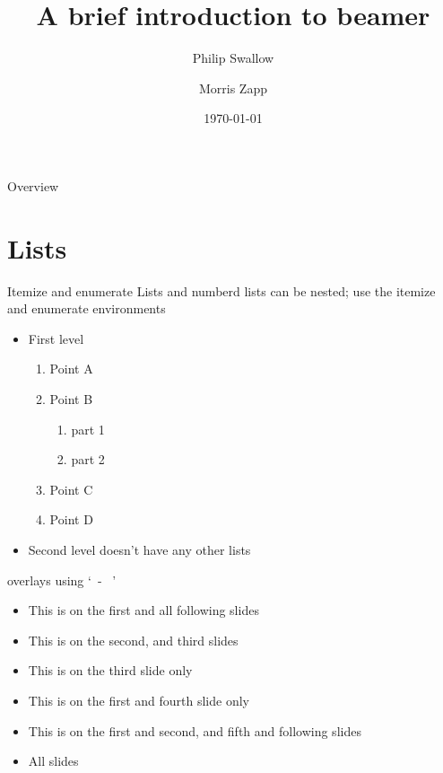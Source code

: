 \documentclass[12pt, aspectratio=169, xcolor=pdftex]{beamer}
\title{\Huge{A brief introduction to beamer}}
\author{\Large{Philip Swallow} \inst{1}  \and \Large{Morris Zapp}\inst{2}}
\institute[Universities of Rummidge and Euphoria] %
{
 \inst{1} \large{University of Rummidge, UK}
 \inst{2} \large{Euphoria State University, USA}
}
\date{\today}
\begin{document}
\maketitle %


\begin{frame}{Overview}
\tableofcontents
\end{frame}


\section{Lists}
\begin{frame}{Itemize and enumerate}
Lists and numberd lists can be nested; use the itemize and
enumerate environments

\begin{itemize}
\item{First level}
\begin{enumerate}[I]
\item Point A
\item Point B
\begin{enumerate}[i]
\item part 1
\item part 2
\end{enumerate}
\item Point C
\item Point D
\end{enumerate}
\item{Second level doesn't have any other lists}
\end{itemize}
\end{frame}

\begin{frame}{overlays using \lq\ - \ \rq}
\begin{itemize} %
    \item<1-> {This is on the first and all following slides}
    \item<2-3> {This is on the second, and third slides}
    \item<3> {This is on the third slide only}
    \item<1,4> {This is on the first and  fourth slide only}
    \item<1-2, 5-> {This is on the first and second, and fifth and following slides}
    \item{All slides}
\end{itemize}
\end{frame}
\end{document}
